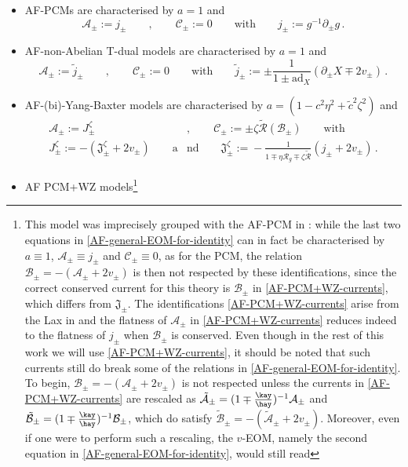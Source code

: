 \documentclass[12pt]{article}
\numberwithin{equation}{section}
\begin{document}
\begin{itemize}
\item AF-PCMs are characterised by $a=1$ and
\begin{equation}
\mathcal{A}_{\pm}:= j_{\pm} 
\qquad , \qquad 
\mathcal{C}_{\pm}:=0
\qquad \text{with} \qquad 
j_{\pm}:=g^{-1}\partial_{\pm}g \, .
\end{equation}
\item AF-non-Abelian T-dual models are characterised by $a=1$ and
\begin{equation}
\mathcal{A}_{\pm} := \tilde{j}_{\pm}
\qquad , \qquad \mathcal{C}_{\pm}:=0
\qquad \text{with} \qquad 
\tilde{j}_{\pm}:= {\pm}\frac{1}{1\pm\mathrm{ad}_{X}}(\partial_{\pm}X\mp 2v_{\pm}) \, .
\end{equation}
\item AF-(bi)-Yang-Baxter models are characterised by $a=(1-c^2\eta^2+\tilde{c}^2\zeta^2)$ and
\begin{equation}\label{AF-summary-AFYB}
\begin{aligned}
\mathcal{A}_{\pm}:=  J_{\pm}^{\zeta}
\qquad &, \qquad 
\mathcal{C}_{\pm}:= \pm\zeta\tilde{\mathcal{R}}(\mathcal{B}_{\pm})
\qquad \text{with} \qquad 
\\
J_{\pm}^{\zeta}:= -(\mathfrak{J}_{\pm}^{\zeta}\!+\!2v_{\pm})
\qquad \text{a}&\text{nd} \qquad 
\mathfrak{J}_{\pm}^{\zeta}\!:=  \!-\frac{1}{1\!\mp\! \eta \mathcal{R}_{g} \!\mp\! \zeta \tilde{\mathcal{R}}}(j_{\pm}\!+\!2v_{\pm}) \, .
\end{aligned}
\end{equation}
\item AF PCM+WZ models\footnote{\label{footnote-WZ-rescaling}This model was imprecisely grouped with the AF-PCM in \cite{Bielli:2025uiv}: while the last two equations in \eqref{AF-general-EOM-for-identity} can in fact be characterised by $a\equiv 1$, $\mathcal{A}_{\pm}\equiv j_{\pm}$ and $\mathcal{C}_{\pm}\equiv 0$, as for the PCM, the relation $\mathcal{B}_{\pm}=-(\mathcal{A}_{\pm}+2v_{\pm})$ is then not respected by these identifications, since the correct conserved current for this theory is $\mathcal{B}_{\pm}$ in \eqref{AF-PCM+WZ-currents}, which differs from $\mathfrak{J}_{\pm}$. The identifications \eqref{AF-PCM+WZ-currents} arise from the Lax in \cite{Bielli:2024ach} and the flatness of $\mathcal{A}_{\pm}$ in \eqref{AF-PCM+WZ-currents} reduces indeed to the flatness of $j_{\pm}$ when $\mathcal{B}_{\pm}$ is conserved. Even though in the rest of this work we will use \eqref{AF-PCM+WZ-currents}, it should be noted that such currents still do break some of the relations in \eqref{AF-general-EOM-for-identity}. To begin, $\mathcal{B}_{\pm}=-(\mathcal{A}_{\pm}+2v_{\pm})$ is not respected unless the currents in \eqref{AF-PCM+WZ-currents} are rescaled as $\tilde{\mathcal{A}}_{\pm}=(1\mp\tfrac{\kay}{\hay})^{-1}\mathcal{A}_{\pm}$ and $\tilde{\mathcal{B}}_{\pm}=(1\mp\tfrac{\kay}{\hay})^{-1}\mathcal{B}_{\pm}$, which do satisfy $\tilde{\mathcal{B}}_{\pm}=-(\tilde{\mathcal{A}}_{\pm}+2v_{\pm})$. Moreover, even if one were to perform such a rescaling, the $v$-EOM, namely the second equation in \eqref{AF-general-EOM-for-identity}, would still read 
}
\end{itemize}
\end{document}
